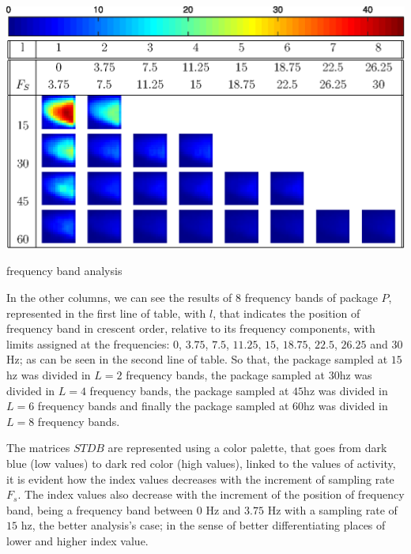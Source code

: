 \documentclass[review]{elsarticle}
\begin{document}
\begin{table}[h!]
\includegraphics[width=\textwidth]{colorbar.eps}
\includegraphics[width=\textwidth]{freq1.eps}
\caption{frequency band analysis}
\label{table:2}
\end{table}
In the other columns, we can see the results of $8$ frequency bands of package $P$,
represented in the first line of table, with $l$, that indicates the position of frequency band
in crescent order, relative to its frequency components, 
with limits assigned at the frequencies: $0$, $3.75$, $7.5$, $11.25$, $15$, $18.75$, $22.5$, $26.25$ and $30$Hz;
as can be seen in the second line of table.
So that, the package sampled at $15$hz was divided in $L=2$ frequency bands, 
the package sampled at $30$hz was divided in $L=4$ frequency bands, 
the package sampled at $45$hz was divided in $L=6$ frequency bands and finally
the package sampled at $60$hz was divided in $L=8$ frequency bands.

The matrices $STDB$ are represented using a color palette, 
that goes from dark blue (low values) to dark red color (high values), 
linked to the values of activity,
it is evident how the index values decreases with
the increment of sampling rate $F_s$.
The index values also decrease with the increment of the position of frequency band,
being  a frequency band between $0$ Hz and $3.75$ Hz with a sampling rate of $15$ hz,
the better analysis's case; in the sense of better differentiating places of lower and higher index value.
\end{document}
